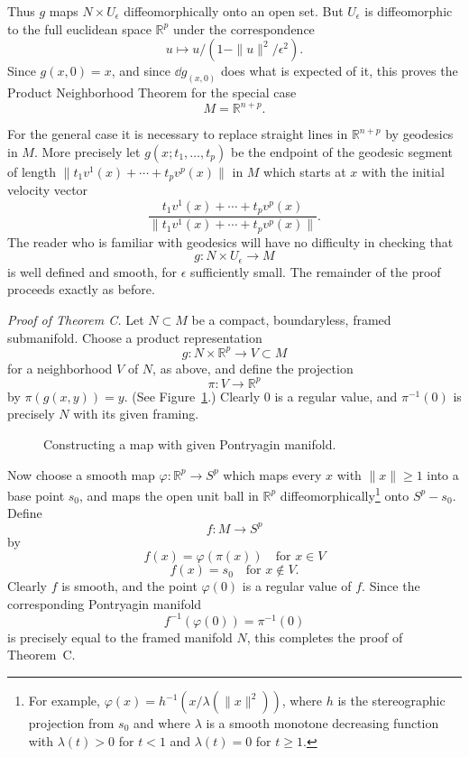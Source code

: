 Thus $g$ maps $N \times U_\epsilon$ diffeomorphically onto an open set. But $U_\epsilon$ is diffeomorphic to the full euclidean space $\mathbb{R}^p$ under the correspondence
\[
u \mapsto u / (1 - \|u\|^2 / \epsilon^2).
\]
Since $g(x, 0) = x$, and since $\dd g_{(x, 0)}$ does what is expected of it, this proves the Product Neighborhood Theorem for the special case
\[
M = \mathbb{R}^{n+p}.
\]

For the general case it is necessary to replace straight lines in $\mathbb{R}^{n+p}$ by geodesics in $M$. More precisely let $g(x; t_1, \ldots, t_p)$ be the endpoint of the geodesic segment of length $\|t_1 v^1(x) + \cdots + t_p v^p(x)\|$ in $M$ which starts at $x$ with the initial velocity vector
\[
\frac{t_1 v^1(x) + \cdots + t_p v^p(x)}{\|t_1 v^1(x) + \cdots + t_p v^p(x)\|}.
\]
The reader who is familiar with geodesics will have no difficulty in checking that
\[
g : N \times U_\epsilon \to M
\]
is well defined and smooth, for $\epsilon$ sufficiently small. The remainder of the proof proceeds exactly as before.

\noindent\textit{Proof of Theorem C.}
Let $N \subset M$ be a compact, boundaryless, framed submanifold. Choose a product representation
\[
g : N \times \mathbb{R}^p \to V \subset M
\]
for a neighborhood $V$ of $N$, as above, and define the projection
\[
\pi : V \to \mathbb{R}^p
\]
by $\pi(g(x, y)) = y$. (See Figure~\ref{fig:milnor-18}.) Clearly $0$ is a regular value, and $\pi^{-1}(0)$ is precisely $N$ with its given framing.

\begin{figure}[htbp]
\centering
\setcounter{figure}{17}%
\caption{Constructing a map with given Pontryagin manifold.}\label{fig:milnor-18}
\end{figure}




Now choose a smooth map $\varphi : \mathbb{R}^p \to S^p$ which maps every $x$ with $\|x\| \ge 1$ into a base point $s_0$, and maps the open unit ball in $\mathbb{R}^p$ diffeomorphically\footnote{For example, $\varphi(x) = h^{-1}(x / \lambda(\|x\|^2))$, where $h$ is the stereographic projection from $s_0$ and where $\lambda$ is a smooth monotone decreasing function with $\lambda(t) > 0$ for $t < 1$ and $\lambda(t) = 0$ for $t \ge 1$.} onto $S^p - s_0$. Define
\[
f : M \to S^p
\]
by
\[
f(x) = \varphi(\pi(x)) \quad \text{for } x \in V
\]
\[
f(x) = s_0 \quad \text{for } x \notin V.
\]
Clearly $f$ is smooth, and the point $\varphi(0)$ is a regular value of $f$. Since the corresponding Pontryagin manifold
\[
f^{-1}(\varphi(0)) = \pi^{-1}(0)
\]
is precisely equal to the framed manifold $N$, this completes the proof of Theorem~C.


